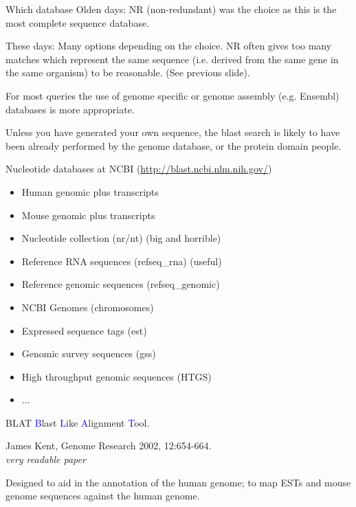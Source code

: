 \documentclass[pdf]{beamer}
\begin{document}
\begin{frame}{Which database}
  Olden days: NR (non-redundant) was the choice as this is the most
  complete sequence database. 

  These days: Many options depending on the choice. NR often gives too many
  matches which represent the same sequence (i.e. derived from the same gene
  in the same organism) to be reasonable. (See previous slide).

  For most queries the use of genome specific or genome assembly
  (e.g. Ensembl) databases is more appropriate.

  Unless you have generated your own sequence, the blast search is likely to
  have been already performed by the genome database, or the protein domain people.
\end{frame}

\begin{frame}{Nucleotide databases}
  at NCBI (\url{http://blast.ncbi.nlm.nih.gov/})
  \begin{itemize}
    \item Human genomic plus transcripts
    \item Mouse genomic plus transcripts
    \item Nucleotide collection (nr/nt) (big and horrible)
    \item Reference RNA sequences (refseq\_rna) (useful)
    \item Reference genomic sequences (refseq\_genomic)
    \item NCBI Genomes (chromosomes)
    \item Expressed sequence tags (est)
    \item Genomic survey sequences (gss)
    \item High throughput genomic sequences (HTGS)
    \item ...
  \end{itemize}
\end{frame}

\begin{frame}{BLAT}
  \textcolor{blue}{B}last \textcolor{blue}{L}ike \textcolor{blue}{A}lignment
  \textcolor{blue}{T}ool.
  
  James Kent, Genome Research 2002, 12:654-664.\\
  \emph{very readable paper}

  Designed to aid in the annotation of the human genome; to map ESTs and mouse
  genome sequences against the human genome.
\end{frame}
\end{document}
